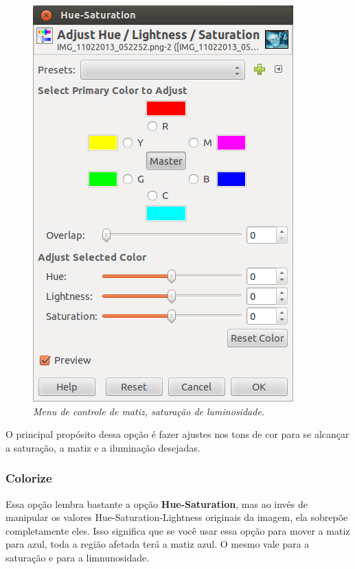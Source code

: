 \documentclass[12pt,onecolumn]{article}
\begin{document}
        \begin{figure}[H]
          \centering
          \includegraphics[width=.6\linewidth]{screenshots/09-hue_saturation.png}
          \caption{
            \footnotesize
            \it
            Menu de controle de matiz, saturação de luminosidade.
          }
          \label{fig:hue_saturation}
        \end{figure}
        
        O principal propósito dessa opção é fazer ajustes nos tons de cor para
        se alcançar a saturação, a matiz e a iluminação desejadas.
      
      \subsubsection{Colorize}
        Essa opção lembra bastante a opção \textbf{Hue-Saturation}, mas ao invés
        de manipular os valores Hue-Saturation-Lightness originais da imagem,
        ela sobrepõe completamente eles. Isso significa que se você usar essa
        opção para mover a matiz para azul, toda a região afetada terá a matiz
        azul. O mesmo vale para a saturação e para a limnunosidade.
        
\end{document}
